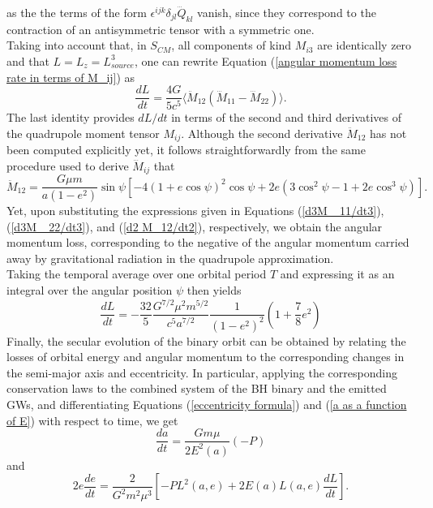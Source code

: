 \documentclass[12pt,twoside,openany]{book}
\begin{document}
as the the terms of the form $\epsilon^{ijk}\delta_{jl}\dddot{Q}_{kl}$ vanish, since they correspond to the contraction of an antisymmetric tensor with a symmetric one.\\Taking into account that, in $S_{CM}$, all components of kind $M_{i3}$ are identically zero and that $L=L_z=L^3_{source}$, one can rewrite Equation (\ref{angular momentum loss rate in terms of M_ij}) as
\begin{equation}
    \frac{dL}{dt}=\frac{4G}{5c^5}\langle \ddot{M}_{12}(\dddot{M}_{11}-\dddot{M}_{22})\rangle.
\end{equation}
The last identity provides $dL/dt$ in terms of the second and third derivatives of the quadrupole moment tensor $M_{ij}$. Although the second derivative $\ddot{M}_{12}$ has not been computed explicitly yet, it follows straightforwardly from the same procedure used to derive $\dddot{M}_{ij}$ that
\begin{equation}\label{d2 M_12/dt2}
\ddot{M}_{12}
=
\frac{G \mu m}{a(1 - e^2)} \sin \psi
\left[
-4(1 + e \cos \psi)^2 \cos \psi
+ 2e \left( 3 \cos^2 \psi - 1 + 2e \cos^3 \psi \right)
\right].
\end{equation}
Yet, upon substituting the expressions given in Equations (\ref{d3M _11/dt3}), (\ref{d3M _22/dt3}), and (\ref{d2 M_12/dt2}), respectively, we obtain the angular momentum loss, corresponding to the negative of the angular momentum carried away by gravitational radiation in the quadrupole approximation.\\Taking the temporal average over one orbital period $T$ and expressing it as an integral over the angular position $\psi$ then yields
\begin{equation}
    \frac{dL}{dt}=-\frac{32}{5}\frac{G^{7/2}\mu^2m^{5/2}}{c^5a^{7/2}}\frac{1}{(1-e^2)^2}\left(1+\frac{7}{8}e^2\right)
\end{equation}
Finally, the secular evolution of the binary orbit can be obtained by relating the losses of orbital energy and angular momentum to the corresponding changes in the semi-major axis and eccentricity. In particular, applying the corresponding conservation laws to the combined system of the BH binary and the emitted GWs, and differentiating Equations (\ref{eccentricity formula}) and (\ref{a as a function of E}) with respect to time, we get
\begin{equation}
    \frac{da}{dt}=\frac{Gm\mu}{2E^2(a)}(-P)
\end{equation}
and
\begin{equation}
    2e\frac{de}{dt}=\frac{2}{G^2m^2\mu^3}\left[-PL^2(a,e)+2E(a)L(a,e)\frac{dL}{dt}\right].
\end{equation}
\end{document}
